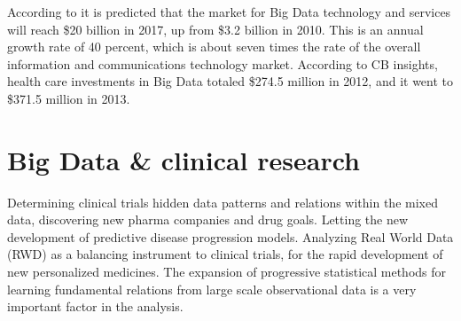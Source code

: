 \documentclass[sigconf]{acmart}
\begin{document}
According to \cite{TR03} it is predicted that the market for Big Data
technology and services will reach \$20 billion in 2017, up from 
\$3.2 billion in 2010. This is an annual growth rate of 40 percent,
which is about seven times the rate of the overall information and
communications technology market. According to CB insights, health
care investments in Big Data totaled \$274.5 million in 2012, and 
it went to \$371.5 million in 2013.

\section{Big Data \& clinical research}
Determining clinical trials hidden data patterns and relations within
the mixed data, discovering new pharma companies and drug goals.
Letting the new development of predictive disease progression models.
Analyzing Real World Data (RWD) as a balancing instrument to 
clinical trials, for the rapid development of new personalized 
medicines. The expansion of progressive statistical methods for 
learning fundamental relations from large scale observational data is a
very important factor in the analysis\cite{TR04}.
\end{document}
